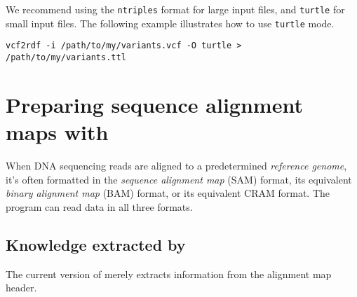   We recommend using the \texttt{ntriples} format for large input files, and
  \texttt{turtle} for small input files.  The following example illustrates how to
  use \texttt{turtle} mode.

\begin{siderules}
\begin{verbatim}
vcf2rdf -i /path/to/my/variants.vcf -O turtle > /path/to/my/variants.ttl
\end{verbatim}
\end{siderules}

\section{Preparing sequence alignment maps with }

  When DNA sequencing reads are aligned to a predetermined \emph{reference
  genome}, it's often formatted in the \emph{sequence alignment map} (SAM)
  format, its equivalent \emph{binary alignment map} (BAM) format, or its
  equivalent CRAM format.  The  program can read data in all
  three formats.

\subsection{Knowledge extracted by }

  The current version of  merely extracts information from the
  alignment map header.

